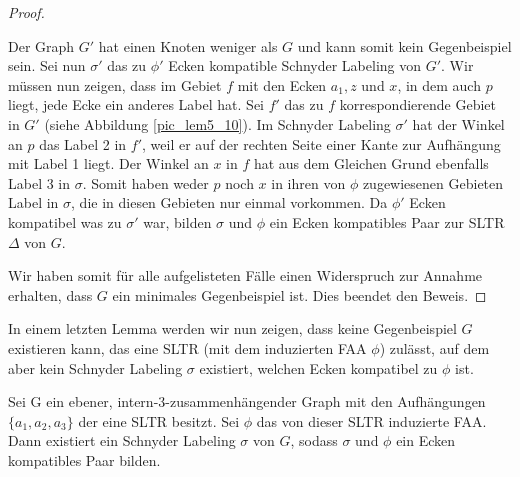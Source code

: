 \begin{proof}
\begin{description}[leftmargin =0pt, font = \bfseries]
Der Graph $G'$ hat einen Knoten weniger als $G$ und kann somit kein Gegenbeispiel sein. Sei nun $\sigma'$ das zu $\phi'$ Ecken kompatible Schnyder Labeling von $G'$. Wir müssen nun zeigen, dass im Gebiet $f$ mit den Ecken $a_1,z$ und $x$, in dem auch $p$ liegt, jede Ecke ein anderes Label hat. Sei $f'$ das zu $f$ korrespondierende Gebiet in $G'$ (siehe Abbildung \ref{pic_lem5_10}). Im Schnyder Labeling $\sigma'$ hat der Winkel an $p$ das Label 2 in $f'$, weil er auf der rechten Seite einer Kante zur Aufhängung mit Label 1 liegt. Der Winkel an $x$ in $f$ hat aus dem Gleichen Grund ebenfalls Label 3 in $\sigma$. Somit haben weder $p$ noch $x$ in ihren von $\phi$ zugewiesenen Gebieten Label in $\sigma$, die in diesen Gebieten nur einmal vorkommen. Da $\phi'$ Ecken kompatibel was zu $\sigma'$ war, bilden $\sigma$ und $\phi$ ein Ecken kompatibles Paar zur SLTR $\Delta$ von $G$.
\end{description}
Wir haben somit für alle aufgelisteten Fälle einen Widerspruch zur Annahme erhalten, dass $G$ ein minimales Gegenbeispiel ist. Dies beendet den Beweis.
\end{proof}

In einem letzten Lemma werden wir nun zeigen, dass keine Gegenbeispiel $G$ existieren kann, das eine SLTR (mit dem induzierten FAA $\phi$) zulässt, auf dem aber kein Schnyder Labeling $\sigma$ existiert, welchen Ecken kompatibel zu $\phi$ ist.

\begin{lemma}\label{lem6}
Sei G ein ebener, intern-3-zusammenhängender Graph mit den Aufhängungen $\{a_1,a_2,a_3\}$ der eine SLTR besitzt. Sei $\phi$ das von dieser SLTR induzierte FAA. Dann existiert ein Schnyder Labeling $\sigma$ von $G$, sodass $\sigma$ und $\phi$ ein Ecken kompatibles Paar bilden.
\end{lemma}

